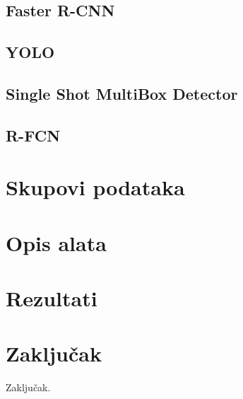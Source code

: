\documentclass[times, utf8, diplomski]{fer}
\begin{document}
\section{Faster R-CNN}


\section{YOLO}


\section{Single Shot MultiBox Detector}


\section{R-FCN}


\chapter{Skupovi podataka}


\chapter{Opis alata}


\chapter{Rezultati}




\chapter{Zaključak}
Zaključak.








\end{document}
